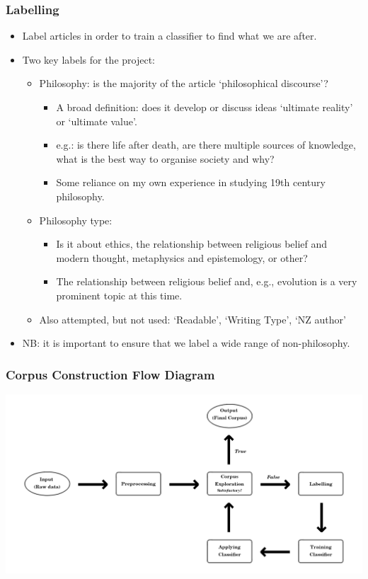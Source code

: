 \documentclass[10pt, compress]{beamer}
\begin{document}
\begin{frame}
	\frametitle{Labelling}

	\pause

  \begin{itemize}[<+- | alert@+>]
		\item Label articles in order to train a classifier to find what we are after.
		\item Two key labels for the project:
		\begin{itemize}
			\item Philosophy: is the majority of the article `philosophical discourse'?
			\begin{itemize}
				\item A broad definition: does it develop or discuss ideas `ultimate reality' or `ultimate value'.
				\item e.g.: is there life after death, are there multiple sources of knowledge, what is the best way to organise society and why?
				\item Some reliance on my own experience in studying 19th century philosophy.
			\end{itemize}
			\item Philosophy type:
			\begin{itemize}
				\item Is it about ethics, the relationship between religious belief and modern thought, metaphysics and epistemology, or other?
				\item The relationship between religious belief and, e.g., evolution is a very prominent topic at this time.
			\end{itemize}
		\item Also attempted, but not used: `Readable', `Writing Type', `NZ author'
		\end{itemize}
		\item NB: it is important to ensure that we label a wide range of non-philosophy.
	\end{itemize}

\end{frame}

\begin{frame}
	\frametitle{Corpus Construction Flow Diagram}
	\begin{center}
	\includegraphics[width=\textwidth]{images/flow_diagram.png}
	\end{center}
\end{frame}
\end{document}
